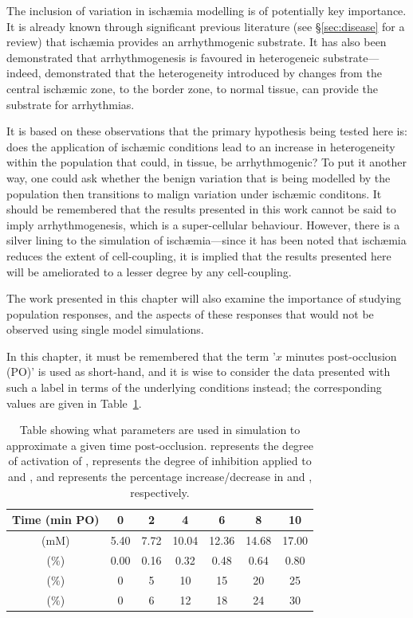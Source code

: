 \documentclass[../thesis-main.tex]{subfiles}
\begin{document}
The inclusion of variation in isch\ae{}mia modelling is of potentially key importance. It is already known through significant previous literature (see \S\ref{sec:disease} for a review) that isch\ae{}mia provides an arrhythmogenic substrate. It has also been demonstrated that arrhythmogenesis is favoured in heterogeneic substrate---indeed, \citet{Tice2007} demonstrated that the heterogeneity introduced by changes from the central isch\ae{}mic zone, to the border zone, to normal tissue, can provide the substrate for arrhythmias.

It is based on these observations that the primary hypothesis being tested here is: does the application of isch\ae{}mic conditions lead to an increase in heterogeneity within the population that could, in tissue, be arrhythmogenic? To put it another way, one could ask whether the benign variation that is being modelled by the population then transitions to malign variation under isch\ae{}mic conditons. It should be remembered that the results presented in this work cannot be said to imply arrhythmogenesis, which is a super-cellular behaviour. However, there is a silver lining to the simulation of isch\ae{}mia---since it has been noted that isch\ae{}mia reduces the extent of cell-coupling, it is implied that the results presented here will be ameliorated to a lesser degree by any cell-coupling.

The work presented in this chapter will also examine the importance of studying population responses, and the aspects of these responses that would not be observed using single model simulations.

In this chapter, it must be remembered that the term '$x$ minutes post-occlusion (PO)' is used as short-hand, and it is wise to consider the data presented with such a label in terms of the underlying conditions instead; the corresponding values are given in Table~\ref{table:isch-params}.
\begin{table}
 \centering
 \begin{tabular}{c|cccccc}
  Time (min PO) & 0 & 2 & 4 & 6 & 8 & 10 \\
  \hline
  \hline
  \ko{} (mM) & 5.40 & 7.72 & 10.04 & 12.36 & 14.68 & 17.00 \\
  \fkatp{} ($\%$) & 0.00 & 0.16 & 0.32 & 0.48 & 0.64 & 0.80 \\
  \finhib{} ($\%$) & 0 & 5 & 10 & 15 & 20 & 25 \\
  \fna{} ($\%$) & 0 & 6 & 12 & 18 & 24 & 30
 \end{tabular}
 \caption[Isch\ae{}mic environment parameters]{Table showing what parameters are used in simulation to approximate a given time post-occlusion. \fkatp{} represents the degree of activation of \ikatp{}, \finhib{} represents the degree of inhibition applied to \ina{} and \ica{}, and \fna{} represents the percentage increase/decrease in \nai{} and \inak{}, respectively.}
 \label{table:isch-params}
\end{table}
\end{document}
